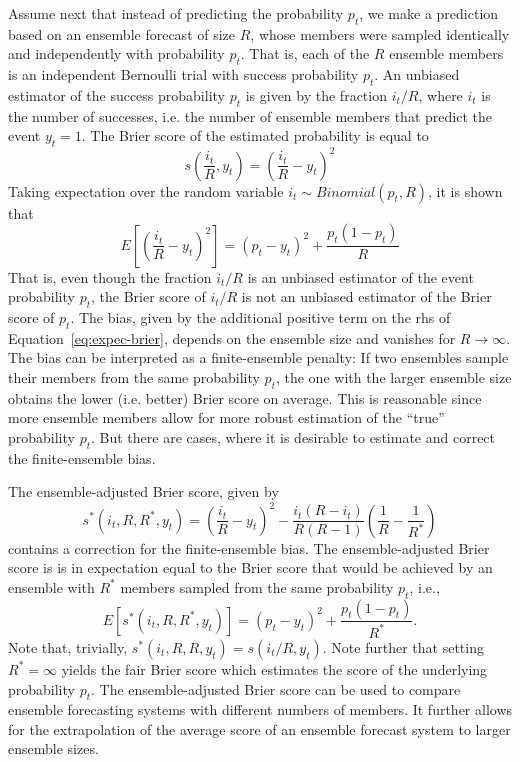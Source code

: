\documentclass[article]{jss}
\begin{document}
Assume next that instead of predicting the probability $p_t$, we make a prediction based on an ensemble forecast of size $R$, whose members were sampled identically and independently with probability $p_t$.
That is, each of the $R$ ensemble members is an independent Bernoulli trial with success probability $p_t$.
An unbiased estimator of the success probability $p_t$ is given by the fraction $i_t/R$, where $i_t$ is the number of successes, i.e. the number of ensemble members that predict the event $y_t=1$.
The Brier score of the estimated probability is equal to
%
\begin{equation}
s\left(\frac{i_t}{R}, y_t\right) = \left(\frac{i_t}{R} - y_t\right)^2
\label{eq:unfair-brier}
\end{equation}
%
Taking expectation over the random variable $i_t \sim Binomial(p_t, R)$, it is shown that \citep{ferro2008effect}
%
\begin{equation}
E\left[\left(\frac{i_t}{R} - y_t\right)^2\right] = (p_t - y_t)^2 +\frac{p_t(1-p_t)}{R}
\label{eq:expec-brier}
\end{equation}
%
That is, even though the fraction $i_t/R$ is an unbiased estimator of the event probability $p_t$, the Brier score of $i_t/R$ is not an unbiased estimator of the Brier score of $p_t$.
The bias, given by the additional positive term on the rhs of Equation~\ref{eq:expec-brier}, depends on the ensemble size and vanishes for $R\rightarrow\infty$.
The bias can be interpreted as a finite-ensemble penalty: If two ensembles sample their members from the same probability $p_t$, the one with the larger ensemble size obtains the lower (i.e. better) Brier score on average.
This is reasonable since more ensemble members allow for more robust estimation of the ``true'' probability $p_t$.
But there are cases, where it is desirable to estimate and correct the finite-ensemble bias.


The ensemble-adjusted Brier score, given by \citep{ferro2008effect}
%
\begin{equation}
s^*(i_t, R, R^*, y_t) = \left(\frac{i_t}{R} - y_t\right)^2 - \frac{i_t(R-i_t)}{R(R-1)}\left(\frac{1}{R} - \frac{1}{R^*}\right)
\label{eq:ens-brier}
\end{equation}
%
contains a correction for the finite-ensemble bias.
The ensemble-adjusted Brier score is is in expectation equal to the Brier score that would be achieved by an ensemble with $R^*$ members sampled from the same probability $p_t$, i.e., 
%
\begin{equation}
E\left[s^*(i_t, R, R^*, y_t)\right] = (p_t - y_t)^2 + \frac{p_t(1-p_t)}{R^*}.
\end{equation}
%
Note that, trivially, $s^*(i_t, R, R, y_t) = s(i_t/R, y_t)$.
Note further that setting $R^*=\infty$ yields the fair Brier score \citep{ferro2013fair} which estimates the score of the underlying probability $p_t$.
The ensemble-adjusted Brier score can be used to compare ensemble forecasting systems with different numbers of members.
It further allows for the extrapolation of the average score of an ensemble forecast system to larger ensemble sizes.
\end{document}

